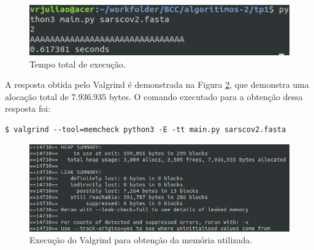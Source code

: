 \begin{figure}[h]
	\begin{center}
		\includegraphics[scale=0.75]{Figuras/total-execution.png}
	\end{center}
	\caption{\label{fig:total-execution} Tempo total de execução.}
\end{figure}


A resposta obtida pelo Valgrind é demonstrada na Figura \ref{fig:valgrind}, que
demonstra uma alocação total de $7.936.935$ bytes.
O comando executado para a obtenção dessa resposta foi:
\lstset{language=bash}
\begin{lstlisting}[frame=single]
$ valgrind --tool=memcheck python3 -E -tt main.py sarscov2.fasta
\end{lstlisting}

\begin{figure}[h]
	\begin{center}
		\includegraphics[scale=0.5]{Figuras/valgrind.png}
	\end{center}
	\caption{\label{fig:valgrind} Execução do Valgrind para obtenção da memória utilizada.}
\end{figure}